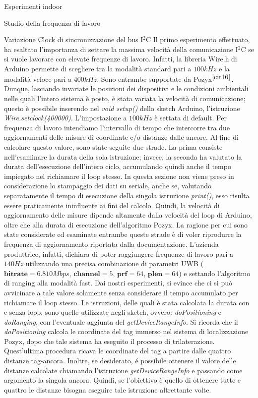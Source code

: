 \documentclass[12pt]{report}
\begin{document}
\begin{section}{Esperimenti indoor}
\begin{subsection}{Studio della frequenza di lavoro}
\begin{subsubsection}{Variazione Clock di sincronizzazione del bus I$^2$C}
			Il primo esperimento effettuato, ha esaltato l’importanza di settare la massima velocità della comunicazione I$^2$C se si vuole lavorare con elevate frequenze di lavoro. Infatti, la libreria Wire.h di Arduino permette di scegliere tra la modalità standard pari a $100kHz$ e la modalità veloce pari a $400kHz$. 						Sono entrambe supportate da Pozyx$^{{\cite{cit16}}}$. Dunque, lasciando invariate le posizioni dei dispositivi e le condizioni ambientali nelle quali l’intero sistema è posto, è stata variata la velocità di comunicazione; questo è possibile inserendo nel \textit{void setup()} dello sketch Arduino, l’istruzione 							\textit{Wire.setclock(400000)}. L'impostazione a $100kHz$ è settata di default. 
			Per frequenza di lavoro intendiamo l’intervallo di tempo che intercorre tra due aggiornamenti delle misure di coordinate e/o distanze dalle ancore. Al fine di calcolare questo valore, sono state seguite due strade. La prima consiste nell’esaminare la durata della sola istruzione; invece, la seconda ha valutato la 						durata dell’esecuzione dell’intero ciclo, accumulando quindi anche il tempo impiegato nel richiamare il loop stesso. In questa sezione non viene preso in considerazione lo stampaggio dei dati su seriale, anche se, valutando separatamente il tempo di esecuzione della singola istruzione \textit{print()}, esso risulta 				essere praticamente ininfluente ai fini del calcolo. Quindi, la velocità di aggiornamento delle misure dipende altamente dalla velocità del loop di Arduino, oltre che alla durata di esecuzione dell'algoritmo Pozyx. La ragione per cui sono state considerate ed esaminate entrambe queste strade è di voler riprodurre la  			frequenza di aggiornamento riportata dalla documentazione. L’azienda produttrice, infatti, dichiara di poter raggiungere frequenze di lavoro pari a $140 Hz$ utilizzando una precisa combinazione di parametri UWB ($\textbf{bitrate} = 6.810Mbps$, $\textbf{channel} =5$, $\textbf{prf} =64$, $\textbf{plen}= 					64$) e settando l’algoritmo di ranging alla modalità fast. Dai nostri esperimenti, si evince che ci si può avvicinare a tale valore solamente senza considerare il tempo accumulato per richiamare il loop stesso. 
			Le istruzioni, delle quali è stata calcolata la durata con e senza loop, sono quelle utilizzate negli sketch, ovvero: \textit{doPositioning} e \textit{doRanging}, con l'eventuale aggiunta del \textit{getDeviceRangeInfo}.
			Si ricorda che il \textit{doPositioning} calcola le coordinate del tag immerso nel sistema di localizzazione Pozyx, dopo che tale sistema ha eseguito il processo di trilaterazione. Quest’ultima procedura ricava le coordinate del tag a partire dalle quattro distanze tag-ancora. Inoltre, se desiderato, é possibile 							ottenere il valore delle distanze calcolate chiamando l’istruzione \textit{getDeviceRangeInfo} e passando come argomento la singola ancora. Quindi, se l’obiettivo è quello di ottenere tutte e quattro le distanze bisogna eseguire tale istruzione altrettante volte.

\end{subsubsection}
\end{subsection}
\end{section}
\end{document}
